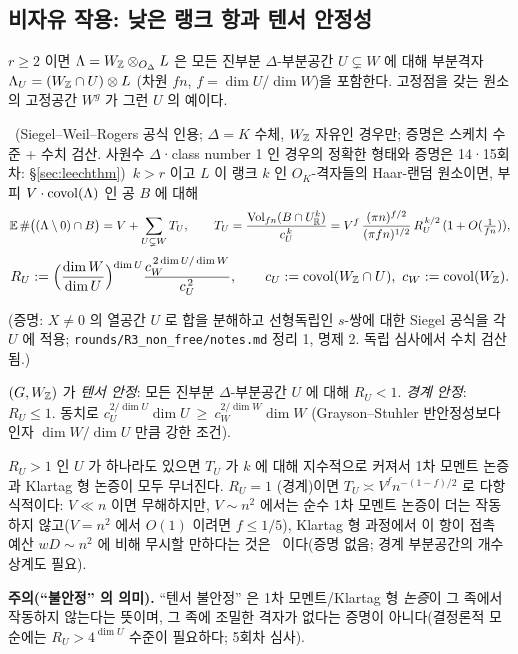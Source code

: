 \subsection{비자유 작용: 낮은 랭크 항과 텐서 안정성}
$r\ge2$ 이면 $\Lambda=W_{\mathbb{Z}}\otimes_{O_\Delta}L$ 은 모든 진부분 $\Delta$-부분공간 $U\subsetneq W$ 에 대해 부분격자 $\Lambda_U=(W_{\mathbb{Z}}\cap U)\otimes L$ (차원 $fn$, $f=\dim U/\dim W$)을 포함한다. 고정점을 갖는 원소의 고정공간 $W^g$ 가 그런 $U$ 의 예이다.

\begin{theorem}\label{thm:meanvalue}\tagPL\ (Siegel--Weil--Rogers 공식 인용; $\Delta=K$ 수체, $W_{\mathbb{Z}}$ 자유인 경우만; 증명은 스케치 수준 + 수치 검산. 사원수 $\Delta$·class number 1 인 경우의 정확한 형태와 증명은 14·15회차: \S\ref{sec:leechthm})\
$k>r$ 이고 $L$ 이 랭크 $k$ 인 $O_K$-격자들의 Haar-랜덤 원소이면, 부피 $V\cdot\mathrm{covol}(\Lambda)$ 인 공 $B$ 에 대해
\[
\mathbb{E}\,\#\big((\Lambda\setminus0)\cap B\big)=V+\sum_{U\subsetneq W}T_U,\qquad
T_U=\frac{\mathrm{Vol}_{fn}(B\cap U_{\mathbb{R}}^k)}{c_U^{\,k}}=V^f\,\frac{(\pi n)^{f/2}}{(\pi fn)^{1/2}}\,R_U^{\,k/2}\,(1+O(\tfrac1{fn})),
\]
\[
R_U:=\Big(\frac{\dim W}{\dim U}\Big)^{\dim U}\frac{c_W^{\,2\dim U/\dim W}}{c_U^{\,2}},\qquad c_U:=\mathrm{covol}(W_{\mathbb{Z}}\cap U),\ c_W:=\mathrm{covol}(W_{\mathbb{Z}}).
\]
\end{theorem}
(증명: $X\ne0$ 의 열공간 $U$ 로 합을 분해하고 선형독립인 $s$-쌍에 대한 Siegel 공식을 각 $U$ 에 적용; \texttt{rounds/R3\_non\_free/notes.md} 정리 1, 명제 2. 독립 심사에서 수치 검산됨.)

\begin{definition}
$(G,W_{\mathbb{Z}})$ 가 \emph{텐서 안정}: 모든 진부분 $\Delta$-부분공간 $U$ 에 대해 $R_U<1$. \emph{경계 안정}: $R_U\le1$.
동치로 $c_U^{2/\dim U}\dim U\ \ge\ c_W^{2/\dim W}\dim W$ (Grayson--Stuhler 반안정성보다 인자 $\dim W/\dim U$ 만큼 강한 조건).
\end{definition}
$R_U>1$ 인 $U$ 가 하나라도 있으면 $T_U$ 가 $k$ 에 대해 지수적으로 커져서 1차 모멘트 논증과 Klartag 형 논증이 모두 무너진다. $R_U=1$ (경계)이면 $T_U\asymp V^fn^{-(1-f)/2}$ 로 다항식적이다: $V\ll n$ 이면 무해하지만, $V\sim n^2$ 에서는 순수 1차 모멘트 논증이 더는 작동하지 않고($V=n^2$ 에서 $O(1)$ 이려면 $f\le1/5$), Klartag 형 과정에서 이 항이 접촉 예산 $wD\sim n^2$ 에 비해 무시할 만하다는 것은 \tagH\ 이다(증명 없음; 경계 부분공간의 개수 상계도 필요).

\textbf{주의(``불안정'' 의 의미).} ``텐서 불안정'' 은 1차 모멘트/Klartag 형 \emph{논증}이 그 족에서 작동하지 않는다는 뜻이며, 그 족에 조밀한 격자가 없다는 증명이 아니다(결정론적 모순에는 $R_U>4^{\dim U}$ 수준이 필요하다; 5회차 심사).

